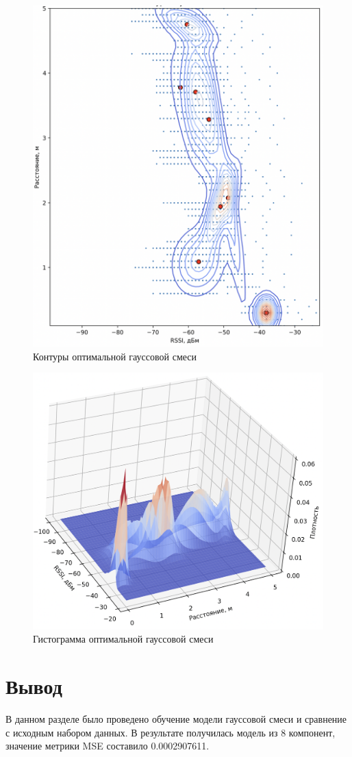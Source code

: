 \begin{figure}[H]
	\centering
	\includegraphics[width=\textwidth]{assets/deep.png}
	\caption{Контуры оптимальной гауссовой смеси}
	\label{fig:deep}
\end{figure}

\begin{figure}[H]
	\centering
	\includegraphics[width=\textwidth]{assets/gmm-hist.png}
	\caption{Гистограмма оптимальной гауссовой смеси}
	\label{fig:gmm-hist}
\end{figure}



\section{Вывод}

В данном разделе было проведено обучение модели гауссовой смеси и сравнение с исходным набором данных. В результате получилась модель из 8 компонент, значение метрики MSE составило 0.0002907611.


